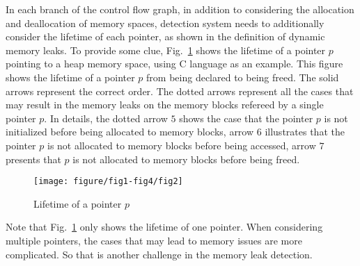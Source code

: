 In each branch of the control flow graph, in addition to considering the allocation and deallocation of memory spaces, detection system needs to additionally consider the lifetime of each pointer, as shown in the definition of dynamic memory leaks. To provide some clue, Fig.~\ref{fig:2} shows the lifetime of a pointer $p$ pointing to a heap memory space, using C language as an example. This figure shows the lifetime of a pointer $p$ from being declared to being freed. The solid arrows represent the correct order. The dotted arrows represent all the cases that may result in the memory leaks on the memory blocks refereed by a single pointer $p$. In details, the dotted arrow $5$ shows the case that the pointer $p$ is not initialized before being allocated to memory blocks, arrow $6$ illustrates that the pointer $p$ is not allocated to memory blocks before being accessed, arrow $7$ presents that $p$ is not allocated to memory blocks before being freed.

\begin{figure}[!h]
\center
\texttt{[image: figure/fig1-fig4/fig2]}
\caption{Lifetime of a pointer $p$}
\label{fig:2}
\end{figure}

Note that Fig.~\ref{fig:2} only shows the lifetime of one pointer. When considering multiple pointers, the cases that may lead to memory issues are more complicated. So that is another challenge in the memory leak detection.
